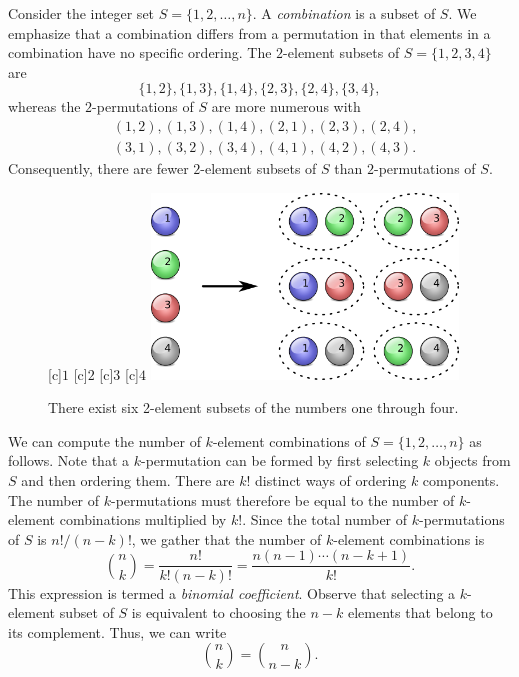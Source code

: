 Consider the integer set $S = \{ 1, 2, \ldots, n \}$.
A \emph{combination} is a subset of $S$. 
We emphasize that a combination differs from a permutation in that elements in a combination have no specific ordering.
The $2$-element subsets of $S = \{ 1, 2, 3, 4 \}$ are
\begin{equation*}
\{ 1, 2 \}, \{ 1, 3 \}, \{ 1, 4 \}, \{ 2, 3 \}, \{ 2, 4 \}, \{ 3, 4 \} ,
\end{equation*}
whereas the $2$-permutations of $S$ are more numerous with
\begin{equation*}
\begin{split}
&( 1, 2 ), ( 1, 3 ), ( 1, 4 ), ( 2, 1 ), ( 2, 3 ), ( 2, 4 ), \\
&( 3, 1 ), ( 3, 2 ), ( 3, 4 ), ( 4, 1 ), ( 4, 2 ), ( 4, 3 ) .
\end{split}
\end{equation*}
Consequently, there are fewer $2$-element subsets of $S$ than $2$-permutations of $S$.

\begin{figure}[htb!]
\begin{center}
\begin{psfrags}
[c]{$1$}
[c]{$2$}
[c]{$3$}
[c]{$4$}
\includegraphics[height=4.95cm]{Figures/4Chapter/combination}
\end{psfrags}
\caption{There exist six 2-element subsets of the numbers one through four.}
\label{figure:Combination}
\end{center}
\end{figure}

We can compute the number of $k$-element combinations of $S = \{ 1, 2, \ldots, n \}$ as follows.
Note that a $k$-permutation can be formed by first selecting $k$ objects from $S$ and then ordering them.
There are $k!$ distinct ways of ordering $k$ components.
The number of $k$-permutations must therefore be equal to the number of $k$-element combinations multiplied by $k!$.
Since the total number of $k$-permutations of $S$ is $n! / (n-k)!$, we gather that the number of $k$-element combinations is
\begin{equation*}
\binom{n}{k} = \frac{n!}{k! (n-k)!} = \frac{ n (n-1) \cdots (n-k+1) }{ k! } .
\end{equation*}
This expression is termed a \emph{binomial coefficient}. 
Observe that selecting a $k$-element subset of $S$ is equivalent to choosing the $n-k$ elements that belong to its complement.
Thus, we can write
\begin{equation*}
\binom{n}{k} = \binom{n}{n-k} .
\end{equation*}


